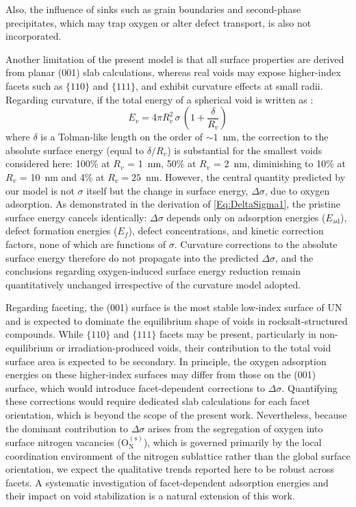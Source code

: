 \documentclass[preprint,12pt,sort&compress]{elsarticle}
\newcommand{\?}{\stackrel{?}{=}}
\begin{document}
Also, the influence of sinks such as grain boundaries and second-phase precipitates, which may trap oxygen or alter defect transport, is also not incorporated.

Another limitation of the present model is that all surface properties are derived from planar (001) slab calculations, whereas real voids may expose higher-index facets such as $\{110\}$ and $\{111\}$, and exhibit curvature effects at small radii. Regarding curvature, if the total energy of a spherical void is written as \cite{Tolman1949,Chhapadia2011,Wang2021}:
\begin{equation}
E_v = 4 \pi R_v^2 \, \sigma \, \left(1 + \frac{\delta}{R_v} \right)    
\end{equation}
where $\delta$ is a Tolman-like length on the order of $\sim 1$~nm, the correction to the absolute surface energy (equal to $\delta/R_v$) is substantial for the smallest voids considered here: 100\% at $R_v$ = 1~nm, 50\% at $R_v$ = 2~nm, diminishing to 10\% at $R_v$ = 10~nm and 4\% at $R_v = 25$~nm. However, the central quantity predicted by our model is not $\sigma$ itself but the change in surface energy, $\Delta\sigma$, due to oxygen adsorption. As demonstrated in the derivation of \cref{Eq:DeltaSigma1}, the pristine surface energy cancels identically: $\Delta\sigma$ depends only on adsorption energies ($E_\mathrm{ad}$), defect formation energies ($E_f$), defect concentrations, and kinetic correction factors, none of which are functions of $\sigma$. Curvature corrections to the absolute surface energy therefore do not propagate into the predicted $\Delta\sigma$, and the conclusions regarding oxygen-induced surface energy reduction remain quantitatively unchanged irrespective of the curvature model adopted.

Regarding faceting, the (001) surface is the most stable low-index surface of UN and is expected to dominate the equilibrium shape of voids in rocksalt-structured compounds. While $\{110\}$ and $\{111\}$ facets may be present, particularly in non-equilibrium or irradiation-produced voids, their contribution to the total void surface area is expected to be secondary. In principle, the oxygen adsorption energies on these higher-index surfaces may differ from those on the (001) surface, which would introduce facet-dependent corrections to $\Delta\sigma$. Quantifying these corrections would require dedicated slab calculations for each facet orientation, which is beyond the scope of the present work. Nevertheless, because the dominant contribution to $\Delta\sigma$ arises from the segregation of oxygen into surface nitrogen vacancies (O$_\mathrm{N}^{(\mathrm{s})}$), which is governed primarily by the local coordination environment of the nitrogen sublattice rather than the global surface orientation, we expect the qualitative trends reported here to be robust across facets. A systematic investigation of facet-dependent adsorption energies and their impact on void stabilization is a natural extension of this work.
\end{document}
